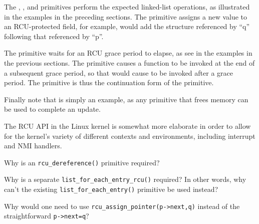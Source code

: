 The , , and
 primitives perform the expected linked-list
operations, as illustrated in the examples in the preceding sections.
The  primitive assigns a new value to an
RCU-protected field, for example, 
would add the structure referenced by ``q'' following that referenced
by ``p''.

The  primitive waits for an RCU grace period
to elapse, as see in the examples in the previous sections.
The  primitive causes a function to be invoked
at the end of a subsequent grace period, so that 
would cause  to be invoked after a grace period.
The  primitive is thus the continuation form of the
 primitive.

Finally note that  is simply an example, as any primitive
that frees memory can be used to complete an update.

The RCU API in the Linux kernel is somewhat more elaborate in order to
allow for the kernel's variety of different contexts and environments,
including interrupt and NMI handlers.

\QuickQuiz{}
	Why is an {\tt rcu\_dereference()} primitive required?
 \QuickQuizEnd

\QuickQuiz{}
	Why is a separate {\tt list\_for\_each\_entry\_rcu()} required?
	In other words, why can't the existing
	{\tt list\_for\_each\_entry()} primitive be used instead?
 \QuickQuizEnd

\QuickQuiz{}
	Why would one need to use {\tt rcu\_assign\_pointer(p->next,q)}
	instead of the straightforward {\tt p->next=q}?
 \QuickQuizEnd

